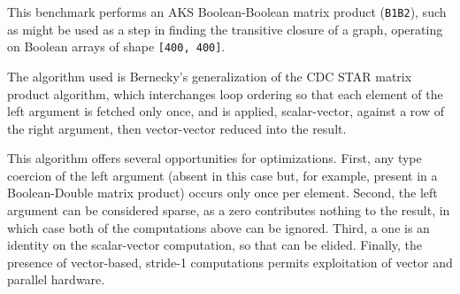 This benchmark performs an AKS Boolean-Boolean matrix 
product ({\tt B1\qor\qdot\qand\0B2}),
such as might be used as a step in finding the transitive closure of
a graph, operating on Boolean arrays of shape {\tt [400, 400]}. 

The algorithm used is Bernecky's generalization of
the CDC STAR matrix product algorithm,
which interchanges loop ordering so that each element
of the left argument is fetched only once, and is
applied, scalar-vector, against a row of the right argument,
then vector-vector reduced into the result.~\cite{RBernecky:apex}

This algorithm offers several opportunities for optimizations.
First, any type coercion of the left argument (absent in this
case but, for example, present in a Boolean-Double matrix 
product) occurs only once per element. Second, the left
argument can be considered sparse, as a zero 
contributes nothing to the result, in which case both of the computations
above can be ignored. Third, a one is an identity on the 
scalar-vector computation, so that can be elided.
Finally, the presence of vector-based, stride-1 computations
permits exploitation of vector and parallel hardware.

